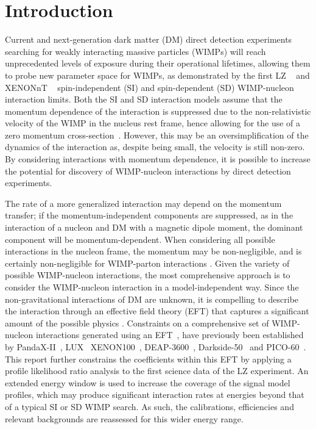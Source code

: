 \documentclass[reprint, showpacs,
preprintnumbers,
amsmath,amssymb,
aps, floatfix,
superscriptaddress,
prd, nofootinbib]{revtex4-1}
\begin{document}
\section{\label{sec:introduction}Introduction}
Current and next-generation dark matter (DM) direct detection experiments searching for weakly interacting massive particles (WIMPs) will reach unprecedented levels of exposure during their operational lifetimes, allowing them to probe new parameter space for WIMPs, as demonstrated by the first LZ ~\cite{LZ:SR1WS_2022} and XENONnT ~\cite{XenonNT:WS_2023} spin-independent (SI) and spin-dependent (SD) WIMP-nucleon interaction limits. 
Both the SI and SD interaction models assume that the momentum dependence of the interaction is suppressed due to the non-relativistic velocity of the WIMP in the nucleus rest frame, hence allowing for the use of a zero momentum cross-section~\cite{JUNGMAN:Supersymmetric_dark_matter}. 
However, this may be an oversimplification of the dynamics of the interaction as, despite being small, the velocity is still non-zero.
By considering interactions with momentum dependence, it is possible to increase the potential for discovery of WIMP-nucleon interactions by direct detection experiments.
\par
The rate of a more generalized interaction may depend on the momentum transfer; if the momentum-independent components are suppressed, as in the interaction of a nucleon and DM with a magnetic dipole moment, the dominant component will be momentum-dependent.
When considering all possible interactions in the nucleon frame, the momentum may be non-negligible, and is certainly non-negligible for WIMP-parton interactions \cite{Hisano:2017jmz}.
Given the variety of possible WIMP-nucleon interactions, the most comprehensive approach is to consider the WIMP-nucleon interaction in a model-independent way. 
Since the non-gravitational interactions of DM are unknown, it is compelling to describe the interaction through an effective field theory (EFT) that captures a significant amount of the possible physics \cite{georgi:EFT}.
Constraints on a comprehensive set of WIMP-nucleon interactions generated using an EFT~\cite{Fan_2010, Fitzpatrick:EFT}, have previously been established by PandaX-II~\cite{PandaX2:SD_EFT_2019}, LUX~\cite{LUX:EFTR4_2021} XENON100~\cite{Xenon100:EFT_2017}, DEAP-3600~\cite{DEAP:eft_2020}, Darkside-50~\cite{DarkSide-50:eft_2020} and PICO-60~\cite{PICO:photonM_2022}.
This report further constrains the coefficients within this EFT by applying a profile likelihood ratio analysis to the first science data of the LZ experiment.
An extended energy window is used to increase the coverage of the signal model profiles, which may produce significant interaction rates at energies beyond that of a typical SI or SD WIMP search. As such, the calibrations, efficiencies and relevant backgrounds are reassessed for this wider energy range.
\end{document}
